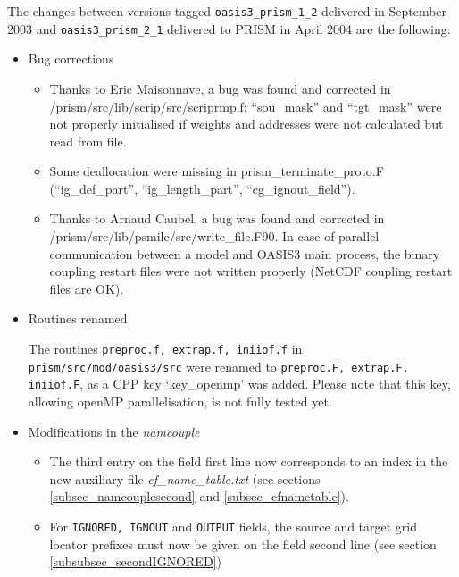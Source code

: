The changes between versions tagged {\tt oasis3\_prism\_1\_2}
delivered in September 2003 and {\tt oasis3\_prism\_2\_1} delivered to
PRISM in April 2004 are the following:

\begin{itemize}

\item Bug corrections

 \begin{itemize}

 \item Thanks to Eric Maisonnave, a bug was found and corrected in
  \- \- \- \- \- \- \- \- 
  /prism/src/lib/scrip/src/scriprmp.f:
  ``sou\_mask'' and ``tgt\_mask'' were not properly initialised if weights
  and addresses were not calculated but read from file.

 \item Some deallocation were missing in prism\_terminate\_proto.F
  (``ig\_def\_part'', ``ig\_length\_part'', ``cg\_ignout\_field'').

 \item Thanks to Arnaud Caubel, a bug was found and corrected in 
  \- \- \- \- \- \- \- \- /prism/src/lib/psmile/src/write\_file.F90. In case of parallel
  communication between a model and OASIS3 main process, the binary
  coupling restart files were not written properly (NetCDF coupling
  restart files are OK).

 \end{itemize} 

\item Routines renamed

The routines {\tt preproc.f, extrap.f, iniiof.f} in {\tt
prism/src/mod/oasis3/src} were renamed to {\tt preproc.F, extrap.F,
iniiof.F}, as a CPP key `key\_openmp' was added. Please note that this
key, allowing openMP parallelisation, is not fully tested yet.

\item Modifications in the {\it namcouple}

\begin{itemize}
\item The third entry on the field first line now corresponds to an index in
the new auxiliary file {\em cf\_name\_table.txt} (see sections
\ref{subsec_namcouplesecond} and \ref{subsec_cfnametable}).

\item For {\tt IGNORED, IGNOUT} and {\tt OUTPUT} fields, the source
and target grid locator prefixes must now be given on the field second
line (see section \ref{subsubsec_secondIGNORED})
\end{itemize}


\end{itemize}
